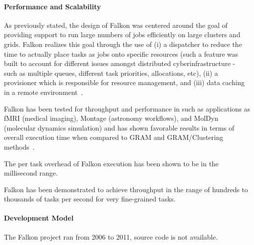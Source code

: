 \documentclass{sig-alternate}
\begin{document}
\paragraph{Performance and Scalability}

As previously stated, the design of Falkon was centered around the goal of
providing support to run large numbers of jobs efficiently on large clusters
and grids.
Falkon realizes this goal through the use of (i) a dispatcher to reduce the
time to actually place tasks as jobs onto specific resources (such a feature
was built to account for different issues amongst distributed
cyberinfrastructure - such as multiple queues, different task priorities,
allocations, etc), (ii) a provisioner which is responsible for resource
management, and (iii) data caching in a remote environment~\cite{1362680}.

Falkon has been tested for throughput and performance in such as applications
as fMRI (medical imaging), Montage (astronomy workflows), and MolDyn (molecular
dynamics simulation) and has shown favorable results in terms of overall
execution time when compared to GRAM and GRAM/Clustering
methods~\cite{1362680}.

The per task overhead of Falkon execution has been shown to be in the
millisecond range.

Falkon has been demonstrated to achieve throughput in the range
of hundreds to thousands of tasks per second for very fine-grained
tasks.

\paragraph{Development Model}

The Falkon project ran from 2006 to 2011, source code is not available.
%
\end{document}
